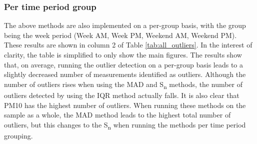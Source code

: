 \documentclass[11pt]{report}
\begin{document}
\subsubsection{Per time period group}

The above methods are also implemented on a per-group basis, with the group being the week period (Week AM, Week PM, Weekend AM, Weekend PM). These results are shown in column 2 of Table \ref{tab:all_outliers}. In the interest of clarity, the table is simplified to only show the main figures. The results show that, on average, running the outlier detection on a per-group basis leads to a slightly decreased number of measurements identified as outliers. Although the number of outliers rises when using the MAD and S\textsubscript{n} methods, the number of outliers detected by using the IQR method actually falls. It is also clear that PM10 has the highest number of outliers. When running these methods on the sample as a whole, the MAD method leads to the highest total number of outliers, but this changes to the S\textsubscript{n} when running the methods per time period grouping.

\end{document}
